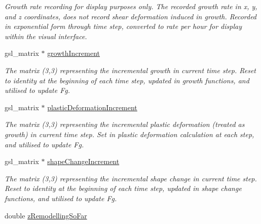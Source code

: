 \begin{DoxyCompactItemize}
\begin{DoxyCompactList}\small\item\em Growth rate recording for display purposes only. The recorded growth rate in x, y, and z coordinates, does not record shear deformation induced in growth. Recorded in exponential form through time step, converted to rate per hour for display within the visual interface. \end{DoxyCompactList}\item 
\hypertarget{classShapeBase_af553856335d7344ea67ab10f9cc3babf}{}gsl\+\_\+matrix $\ast$ \hyperlink{classShapeBase_af553856335d7344ea67ab10f9cc3babf}{growth\+Increment}\label{classShapeBase_af553856335d7344ea67ab10f9cc3babf}

\begin{DoxyCompactList}\small\item\em The matrix (3,3) representing the incremental growth in current time step. Reset to identity at the beginning of each time step, updated in growth functions, and utilised to update Fg. \end{DoxyCompactList}\item 
\hypertarget{classShapeBase_ab61c4a1f4132f54c362ea6296389abf6}{}gsl\+\_\+matrix $\ast$ \hyperlink{classShapeBase_ab61c4a1f4132f54c362ea6296389abf6}{plastic\+Deformation\+Increment}\label{classShapeBase_ab61c4a1f4132f54c362ea6296389abf6}

\begin{DoxyCompactList}\small\item\em The matrix (3,3) representing the incremental plastic deformation (treated as growth) in current time step. Set in plastic deformation calculation at each step, and utilised to update Fg. \end{DoxyCompactList}\item 
\hypertarget{classShapeBase_a2db4859942429aa4e3efc26a119a5aa3}{}gsl\+\_\+matrix $\ast$ \hyperlink{classShapeBase_a2db4859942429aa4e3efc26a119a5aa3}{shape\+Change\+Increment}\label{classShapeBase_a2db4859942429aa4e3efc26a119a5aa3}

\begin{DoxyCompactList}\small\item\em The matrix (3,3) representing the incremental shape change in current time step. Reset to identity at the beginning of each time step, updated in shape change functions, and utilised to update Fg. \end{DoxyCompactList}\item 
\hypertarget{classShapeBase_a0dc566eb70e64da9fc3fa222b16999da}{}double \hyperlink{classShapeBase_a0dc566eb70e64da9fc3fa222b16999da}{z\+Remodelling\+So\+Far}\label{classShapeBase_a0dc566eb70e64da9fc3fa222b16999da}


\end{DoxyCompactItemize}
